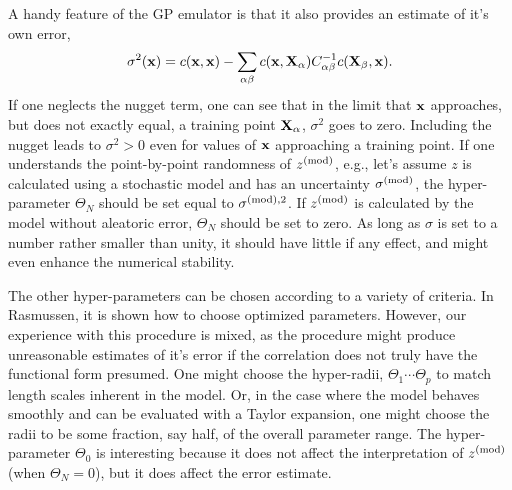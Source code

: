 A handy feature of the GP emulator is that it also provides an estimate of it's own error,
\begin{equation}
\sigma^2({\bf x}) = c({\bf x},{\bf x}) -\sum_{\alpha\beta}c({\bf x},{\bf X}_\alpha)C^{-1}_{\alpha\beta}
c({\bf X}_\beta,{\bf x}).
\end{equation}
If one neglects the nugget term, one can see that in the limit that ${\bf x}$ approaches, but does not exactly equal, a training point ${\bf X}_\alpha$, $\sigma^2$ goes to zero. Including the nugget leads to $\sigma^2>0$ even for values of ${\bf x}$ approaching a training point. If one understands the point-by-point randomness of $z^{\rm(mod)}$, e.g., let's assume $z$ is calculated using a stochastic model and has an uncertainty $\sigma^{\rm(mod)}$, the hyper-parameter $\Theta_N$ should be set equal to $\sigma^{{\rm(mod)},2}$. If $z^{\rm(mod)}$ is calculated by the model without aleatoric error, $\Theta_N$ should be set to zero. As long as $\sigma$ is set to a number rather smaller than unity, it should have little if any effect, and might even enhance the numerical stability.

The other hyper-parameters can be chosen according to a variety of criteria. In Rasmussen, it is shown how to choose optimized parameters. However, our experience with this procedure is mixed, as the procedure might produce unreasonable estimates of it's error if the correlation does not truly have the functional form presumed. One might choose the hyper-radii, $\Theta_1\cdots\Theta_p$ to match length scales inherent in the model. Or, in the case where the model behaves smoothly and can be evaluated with a Taylor expansion, one might choose the radii to be some fraction, say half, of the overall parameter range. The hyper-parameter $\Theta_0$ is interesting because it does not affect the interpretation of $z^{\rm(mod)}$ (when $\Theta_N=0$), but it does affect the error estimate.

